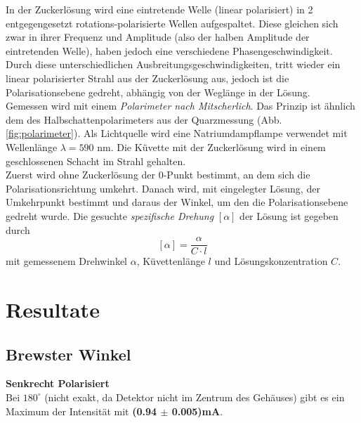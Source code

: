 \documentclass[12pt,a4paper]{article}
\begin{document}
\begin{multicols}{2}
In der Zuckerlösung wird eine eintretende Welle (linear polarisiert) in 2 entgegengesetzt rotations-polarisierte Wellen aufgespaltet. Diese gleichen sich zwar in ihrer Frequenz und Amplitude (also der halben Amplitude der eintretenden Welle), haben jedoch eine verschiedene Phasengeschwindigkeit.\\
Durch diese unterschiedlichen Ausbreitungsgeschwindigkeiten, tritt wieder ein linear polarisierter Strahl aus der Zuckerlösung aus, jedoch ist die Polarisationsebene gedreht, abhängig von der Weglänge in der Lösung.\\
Gemessen wird mit einem \emph{Polarimeter nach Mitscherlich}. Das Prinzip ist ähnlich dem des Halbschattenpolarimeters aus der Quarzmessung (Abb. \ref{fig:polarimeter}). Als Lichtquelle wird eine Natriumdampflampe verwendet mit Wellenlänge $\lambda = 590$ nm. Die Küvette mit der Zuckerlösung wird in einem geschlossenen Schacht im Strahl gehalten.\\
Zuerst wird ohne Zuckerlösung der 0-Punkt bestimmt, an dem sich die Polarisationsrichtung umkehrt. Danach wird, mit eingelegter Lösung, der Umkehrpunkt bestimmt und daraus der Winkel, um den die Polarisationsebene gedreht wurde.
Die gesuchte \emph{spezifische Drehung} $[\alpha]$ der Lösung ist gegeben durch
$$[\alpha] = \frac{\alpha}{C \cdot l}$$
mit gemessenem Drehwinkel $\alpha$, Küvettenlänge $l$ und Lösungskonzentration $C$.




\section{Resultate}

\subsection{Brewster Winkel}
\textbf{Senkrecht Polarisiert}\\
Bei $180^\circ$ (nicht exakt, da Detektor nicht im Zentrum des Gehäuses) gibt es ein Maximum der Intensität mit \textbf{(0.94 $\pm$ 0.005)mA}.\\


\end{multicols}
\end{document}
